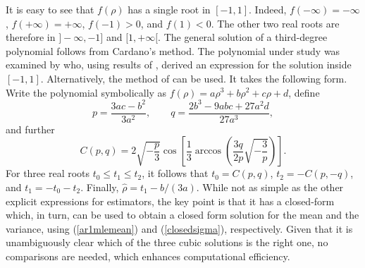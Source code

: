 \documentclass[11pt,a5paper,twoside]{book}
\begin{document}
It is easy to see that $f(\rho)$ has a single root in $[-1,1]$. Indeed, $f(-\infty)=-\infty$, $f(+\infty)=+\infty$, $f(-1)>0$, and $f(1)<0$. The other two real roots are therefore in $]-\infty,-1]$ and $[1,+\infty[$. The general solution of a third-degree polynomial follows from Cardano's method. The polynomial under study was examined by \cite{K81} who, using results of \cite{K42}, derived an expression for the solution inside $[-1,1]$. Alternatively, the method of \cite{S75} can be used. It takes the following form. Write the polynomial symbolically as $f(\rho)=a\rho^3+b\rho^2+c\rho+d$,  define
$$p=\frac{3ac-b^2}{3a^2},\qquad q=\frac{2b^3-9abc+27a^2d}{27a^3},$$
and further
$$C(p,q)=2\sqrt{-\frac{p}{3}}\cos\left[
\frac{1}{3}\arccos\left(
\frac{3q}{2p}\sqrt{-\frac{3}{p}}
\right)
\right].
$$
For three real roots $t_0\le t_1\le t_2$, it follows that $t_0=C(p,q)$, $t_2=-C(p,-q)$, and $t_1=-t_0-t_2$. Finally, $\widehat{\rho}=t_1-b/(3a)$. While not as simple as the other explicit expressions for estimators, the key point is that it has a closed-form which, in turn, can be used to obtain a closed form solution for the mean and the variance, using
(\ref{ar1mlemean}) and (\ref{closedsigma}), respectively. Given that it is unambiguously clear which of the three cubic solutions is the right one, no comparisons are needed, which enhances computational efficiency.
\end{document}
